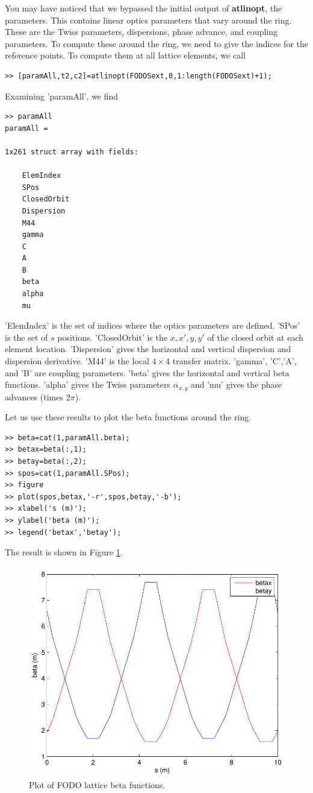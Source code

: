 \documentclass[acus]{article}
\newcommand{\mfun}[1]{{\bf{#1}}}
\begin{document}
You may have noticed that we bypassed the initial output of \mfun{atlinopt},
the parameters.  This contains linear optics parameters that vary around the ring.
These are the Twiss parameters, dispersions, phase advance, and coupling parameters.
To compute these around the ring, we need to give the indices for the reference points.
To compute them at all lattice elements, we call
\begin{verbatim}
>> [paramAll,t2,c2]=atlinopt(FODOSext,0,1:length(FODOSext)+1);
\end{verbatim}
Examining 'paramAll', we find
\begin{verbatim}
>> paramAll
paramAll = 

1x261 struct array with fields:

    ElemIndex
    SPos
    ClosedOrbit
    Dispersion
    M44
    gamma
    C
    A
    B
    beta
    alpha
    mu
\end{verbatim}
'ElemIndex' is the set of indices where the optics parameters are defined.  'SPos'
is the set of $s$ positions.  'ClosedOrbit' is the $x,x',y,y'$ of the closed orbit
at each element location.  'Dispersion' gives the horizontal and vertical dispersion
and dispersion derivative.  'M44' is the local $4\times 4$ transfer matrix.  'gamma',
'C','A', and 'B' are coupling parameters\cite{SaganRubinCoupling}. 'beta' gives the horizontal and vertical beta
functions. 'alpha' gives the Twiss parameters $\alpha_{x,y}$ and 'mu' gives the phase
advances (times $2\pi$).

Let us use these results to plot the beta functions around the ring.
\begin{verbatim}
>> beta=cat(1,paramAll.beta);
>> betax=beta(:,1);
>> betay=beta(:,2);
>> spos=cat(1,paramAll.SPos);
>> figure
>> plot(spos,betax,'-r',spos,betay,'-b');
>> xlabel('s (m)');
>> ylabel('beta (m)');
>> legend('betax','betay');
\end{verbatim}
The result is shown in Figure \ref{FODOBetaPlot}.
\begin{figure}[htb]
\centering
\includegraphics[scale=0.5]{FODOBetaplot.pdf}
\caption{Plot of FODO lattice beta functions.}
\label{FODOBetaPlot}
\end{figure}
\end{document}
